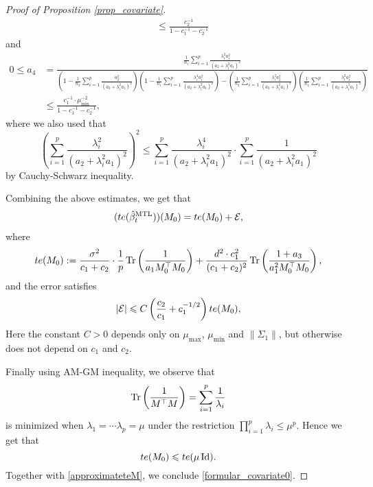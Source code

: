 \begin{proof}[Proof of Proposition \ref{prop_covariate}]
\begin{align*}
&\le \frac{c_2^{-1}}{1-c_1^{-1}-c_2^{-1}}
\end{align*}
and
\begin{align*}
0\le a_4&= \frac{\frac{1}{n_1}\sum_{i=1}^p \frac{\lambda_i^2 a_1^2}{  (a_2 + \lambda_i^2a_1)^2  }}{\left(1- \frac1{n_2}\sum_{i=1}^p \frac{a_2^2}{ (a_2 + \lambda_i^2a_1)^2  }\right) \left(1 - \frac{1}{n_1} \sum_{i=1}^p \frac{\lambda_i^4 a_1^2  }{  (a_2 + \lambda_i^2a_1)^2  }\right) - \left(\frac{1}{n_2}\sum_{i=1}^p \frac{  \lambda_i^2 a_2^2 }{ (  a_2 + \lambda_i^2a_1)^2  }\right) \left(\frac{1}{n_1}\sum_{i=1}^p \frac{\lambda_i^2 a_1^2 }{  (a_2 + \lambda_i^2a_1)^2  }\right)} \\
&\le  \frac{c_1^{-1}\cdot \mu_{\min}^{-2}}{1-c_1^{-1}-c_2^{-1}},
\end{align*}
where we also used that 
$$\left(\sum_{i=1}^p \frac{\lambda_i^2  }{  (a_2 + \lambda_i^2a_1)^2  }\right)^2 \le \sum_{i=1}^p \frac{\lambda_i^4 }{  (a_2 + \lambda_i^2a_1)^2  }\cdot \sum_{i=1}^p \frac{1}{  (a_2 + \lambda_i^2a_1)^2  }$$
by Cauchy-Schwarz inequality.

Combining the above estimates, we get that 
\begin{align}\label{approximateteM}
(te(\hat{\beta}_t^{\text{MTL}}))(M_0) =  te(M_0) + \mathcal E,
\end{align}
where
$$te(M_0):=\frac{\sigma^2}{c_1+c_2}\cdot \frac1p\operatorname{Tr}\left( \frac{1}{a_1M_0^\top M_0}\right)  +\frac{d^2\cdot c_1^2}{(c_1 + c_2)^2} \operatorname{Tr}\left(\frac{1 + a_3}{a_1^2 M_0^{\top}{M_0}} \right),$$
and the error satisfies
$$|\mathcal E|\leqslant C\left( \frac{c_2}{c_1} +c_1^{-1/2}\right)te(M_0),$$
Here the constant $C>0$ depends only on $\mu_{\max}$, $\mu_{\min}$ and $\|\Sigma_1\|$, but otherwise does not depend on $c_1$ and $c_2$. 

%


Finally using AM-GM inequality, we observe that 
$$\operatorname{Tr}\left( \frac{1}{M^\top M}\right) = \sum_{i=1}^p\frac{1}{\lambda_i}$$
is minimized when $\lambda_1 = \cdots\lambda_p=\mu$ under the restriction $\prod_{i=1}^p\lambda_i\le \mu^p$. Hence we get that 
$$ te (M_0)\leqslant te(\mu \operatorname{Id}).$$
Together with \eqref{approximateteM}, we conclude \eqref{formular_covariate0}.
\end{proof}

